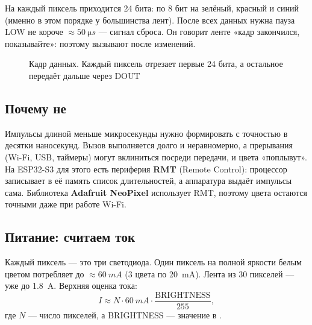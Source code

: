 На каждый пиксель приходится 24 бита: по 8 бит на зелёный, красный и синий (именно в этом порядке у
большинства лент). После всех данных нужна пауза LOW не короче $\approx\SI{50}{\micro s}$ --- сигнал сброса. Он
говорит ленте «кадр закончился, показывайте»: поэтому  вызывают после изменений.

\begin{figure}[H]
\centering
{}
\caption{Кадр данных. Каждый пиксель отрезает первые 24 бита, а остальное передаёт дальше через DOUT}
\end{figure}

\subsection{Почему не }

Импульсы длиной меньше микросекунды нужно формировать с точностью в десятки наносекунд. Вызов
 выполняется долго и неравномерно, а прерывания (Wi-Fi, USB, таймеры) могут вклиниться
посреди передачи, и цвета «поплывут». На ESP32-S3 для этого есть периферия \textbf{RMT} (Remote Control):
процессор записывает в её память список длительностей, а аппаратура выдаёт импульсы сама. Библиотека
\textbf{Adafruit NeoPixel} использует RMT, поэтому цвета остаются точными даже при работе Wi-Fi.

\subsection{Питание: считаем ток}

Каждый пиксель --- это три светодиода. Один пиксель на полной яркости белым цветом потребляет до
$\approx\SI{60}{mA}$ (3 цвета по \SI{20}{mA}). Лента из 30 пикселей --- уже до \SI{1.8}{A}. Верхняя оценка тока:
\[
  I \approx N \cdot \SI{60}{mA} \cdot \frac{\text{BRIGHTNESS}}{255},
\]
где $N$ --- число пикселей, а BRIGHTNESS --- значение в .

